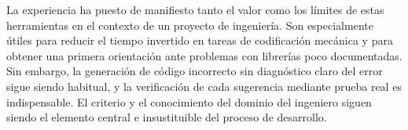 La experiencia ha puesto de manifiesto tanto el valor como los límites de estas herramientas en el contexto de un proyecto de ingeniería. Son especialmente útiles para reducir el tiempo invertido en tareas de codificación mecánica y para obtener una primera orientación ante problemas con librerías poco documentadas. Sin embargo, la generación de código incorrecto sin diagnóstico claro del error sigue siendo habitual, y la verificación de cada sugerencia mediante prueba real es indispensable. El criterio y el conocimiento del dominio del ingeniero siguen siendo el elemento central e insustituible del proceso de desarrollo.
